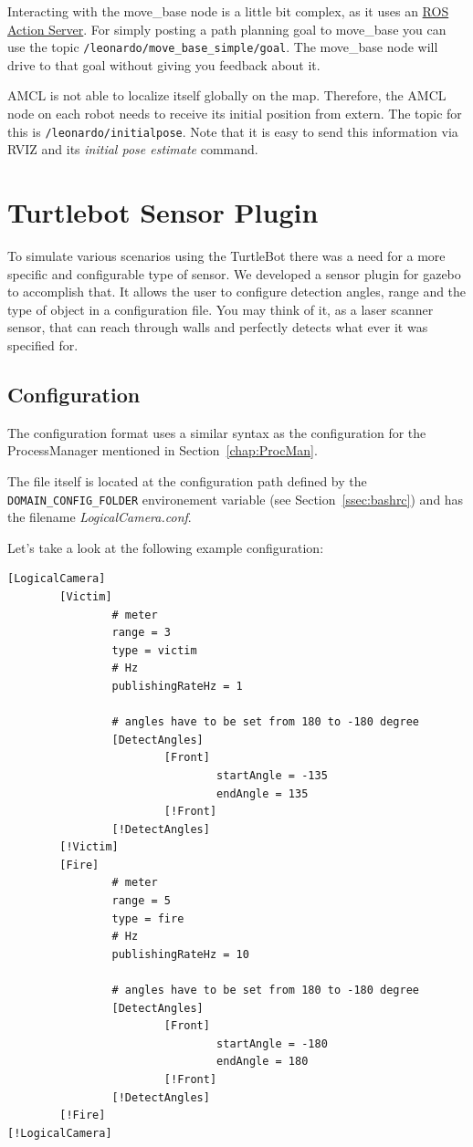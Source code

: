 Interacting with the move\_base node is a little bit complex, as it uses an \href{http://wiki.ros.org/actionlib/Tutorials}{ROS Action Server}. For simply posting a path planning goal to move\_base you can use the topic \verb$/leonardo/move_base_simple/goal$. The move\_base node will drive to that goal without giving you feedback about it. 

AMCL is not able to localize itself globally on the map. Therefore, the AMCL node on each robot needs to receive its initial position from extern. The topic for this is \verb$/leonardo/initialpose$. Note that it is easy to send this information via RVIZ and its \emph{initial pose estimate} command.

\section{Turtlebot Sensor Plugin}

To simulate various scenarios using the TurtleBot there was a need for a more specific and configurable type of sensor. We developed a sensor plugin for gazebo to accomplish that. It allows the user to configure detection angles, range and the type of object in a configuration file. You may think of it, as a laser scanner sensor, that can reach through walls and perfectly detects what ever it was specified for.

\subsection{Configuration}

The configuration format uses a similar syntax as the configuration for the ProcessManager mentioned in Section~\ref{chap:ProcMan}.

The file itself is located at the configuration path defined by the \verb$DOMAIN_CONFIG_FOLDER$ environement variable (see Section~\ref{ssec:bashrc}) and has the filename \textit{LogicalCamera.conf}.

Let's take a look at the following example configuration:

\begin{verbatim}
[LogicalCamera]
        [Victim]
                # meter
                range = 3
                type = victim
                # Hz
                publishingRateHz = 1

                # angles have to be set from 180 to -180 degree
                [DetectAngles]
                        [Front]
                                startAngle = -135
                                endAngle = 135
                        [!Front]
                [!DetectAngles]
        [!Victim]
        [Fire]
                # meter
                range = 5
                type = fire
                # Hz
                publishingRateHz = 10

                # angles have to be set from 180 to -180 degree
                [DetectAngles]
                        [Front]
                                startAngle = -180
                                endAngle = 180
                        [!Front]
                [!DetectAngles]
        [!Fire]
[!LogicalCamera]
\end{verbatim}

